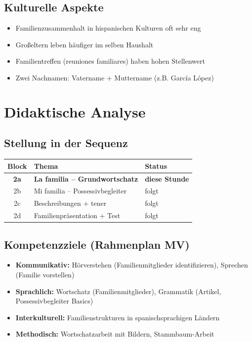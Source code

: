\documentclass[11pt,a4paper]{article}
\begin{document}
\subsection{Kulturelle Aspekte}
\begin{itemize}
    \item Familienzusammenhalt in hispanischen Kulturen oft sehr eng
    \item Großeltern leben häufiger im selben Haushalt
    \item Familientreffen (reuniones familiares) haben hohen Stellenwert
    \item Zwei Nachnamen: Vatername + Muttername (z.B. García López)
\end{itemize}

\section{Didaktische Analyse}

\subsection{Stellung in der Sequenz}
\begin{tabular}{|c|l|l|}
\hline
\textbf{Block} & \textbf{Thema} & \textbf{Status} \\
\hline
\textbf{2a} & \textbf{La familia -- Grundwortschatz} & \textbf{diese Stunde} \\
2b & Mi familia -- Possessivbegleiter & folgt \\
2c & Beschreibungen + tener & folgt \\
2d & Familienpräsentation + Test & folgt \\
\hline
\end{tabular}

\subsection{Kompetenzziele (Rahmenplan MV)}
\begin{itemize}
    \item \textbf{Kommunikativ:} Hörverstehen (Familienmitglieder identifizieren), Sprechen (Familie vorstellen)
    \item \textbf{Sprachlich:} Wortschatz (Familienmitglieder), Grammatik (Artikel, Possessivbegleiter Basics)
    \item \textbf{Interkulturell:} Familienstrukturen in spanischsprachigen Ländern
    \item \textbf{Methodisch:} Wortschatzarbeit mit Bildern, Stammbaum-Arbeit
\end{itemize}
\end{document}

